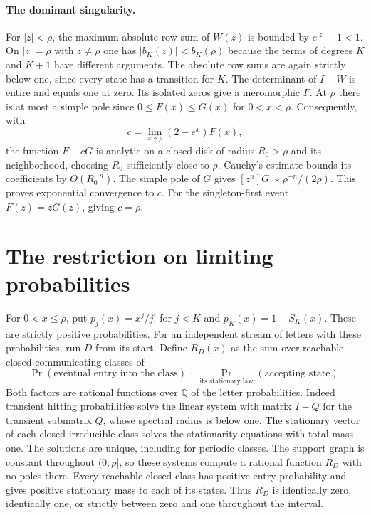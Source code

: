 \documentclass[11pt]{article}
\newcommand{\Q}{\mathbb Q}
\begin{document}
\paragraph{The dominant singularity.}
For $|z|<\rho$, the maximum absolute row sum of $W(z)$ is bounded by $e^{|z|}-1<1$. On $|z|=\rho$ with $z\ne\rho$ one has $|b_K(z)|<b_K(\rho)$ because the terms of degrees $K$ and $K+1$ have different arguments. The absolute row sums are again strictly below one, since every state has a transition for $K$. The determinant of $I-W$ is entire and equals one at zero. Its isolated zeros give a meromorphic $F$. At $\rho$ there is at most a simple pole since $0\le F(x)\le G(x)$ for $0<x<\rho$. Consequently, with
\[
 c=\lim_{x\uparrow\rho}(2-e^x)F(x),
\]
the function $F-cG$ is analytic on a closed disk of radius $R_0>\rho$ and its neighborhood, choosing $R_0$ sufficiently close to $\rho$. Cauchy's estimate bounds its coefficients by $O(R_0^{-n})$. The simple pole of $G$ gives $[z^n]G\sim \rho^{-n}/(2\rho)$. This proves exponential convergence to $c$. For the singleton-first event $F(z)=zG(z)$, giving $c=\rho$.

\section*{The restriction on limiting probabilities}

For $0<x\le\rho$, put $p_j(x)=x^j/j!$ for $j<K$ and $p_K(x)=1-S_K(x)$. These are strictly positive probabilities. For an independent stream of letters with these probabilities, run $D$ from its start. Define $R_D(x)$ as the sum over reachable closed communicating classes of
\[
 \Pr(\text{eventual entry into the class})\ \cdot\
             \Pr_{\text{its stationary law}}(\text{accepting state}).
\]
Both factors are rational functions over $\Q$ of the letter probabilities. Indeed transient hitting probabilities solve the linear system with matrix $I-Q$ for the transient submatrix $Q$, whose spectral radius is below one. The stationary vector of each closed irreducible class solves the stationarity equations with total mass one. The solutions are unique, including for periodic classes. The support graph is constant throughout $(0,\rho]$, so these systems compute a rational function $R_D$ with no poles there. Every reachable closed class has positive entry probability and gives positive stationary mass to each of its states. Thus $R_D$ is identically zero, identically one, or strictly between zero and one throughout the interval.
\end{document}
